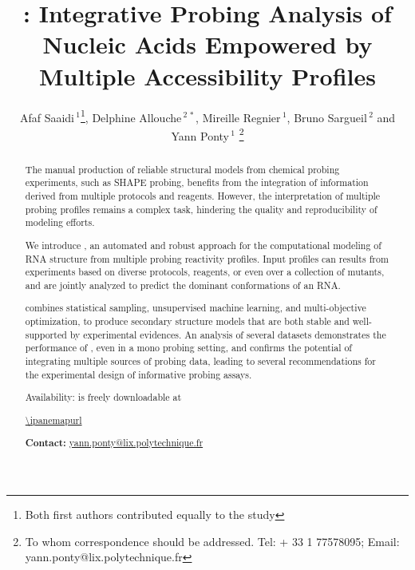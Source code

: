 \documentclass[a4,center,fleqn]{NAR}
\begin{document}
\title{\OurTool{}:  Integrative Probing Analysis of Nucleic Acids Empowered by Multiple Accessibility Profiles}
\author{%
Afaf Saaidi\,$^{1}$\footnote{Both first authors contributed equally to the study},
Delphine Allouche\,$^{2\,*}$,
Mireille Regnier\,$^{1}$,
Bruno Sargueil\,$^{2}$
and Yann Ponty\,$^1$%
\footnote{To whom correspondence should be addressed.
Tel: + 33 1 77578095; Email: yann.ponty@lix.polytechnique.fr}}


\address{%
$^{1}$\,CNRS UMR 7161, LIX, Ecole Polytechnique, France
and
$^{2}$\,CitCoM, Cibles thérapeutiques et conception de Médicaments, CNRS, Université de Paris, 4 avenue de l'observatoire 75006 PARIS France}


\maketitle

\begin{abstract}
The manual production of reliable structural models from chemical probing experiments, such as SHAPE probing, benefits from the integration of information derived from multiple protocols and reagents. However, the interpretation of multiple probing profiles remains a complex task, hindering the quality and reproducibility of modeling efforts.

\noindent We introduce \OurTool{}, an automated and robust approach for the computational modeling of RNA structure from multiple probing reactivity profiles. Input profiles can results from experiments based on diverse protocols, reagents, or even over a collection of mutants, and are jointly analyzed to predict the dominant conformations of an RNA.

\noindent \OurTool{} combines statistical sampling, unsupervised machine learning, and multi-objective optimization, to produce secondary structure models that are both stable and well-supported by experimental evidences. An analysis of several datasets demonstrates the performance of \OurTool, even in a mono probing setting, and confirms the potential of integrating multiple sources of probing data, leading to several recommendations for the experimental design of informative probing assays. 

\noindent Availability: \OurTool{} is freely downloadable at

{\centering \url{\ipanemapurl}\\[.5em]}

\noindent \textbf{Contact:} \href{yann.ponty@lix.polytechnique.fr}{yann.ponty@lix.polytechnique.fr}
\end{abstract}
\end{document}

